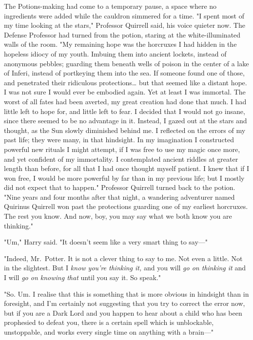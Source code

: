 The Potions-making had come to a temporary pause, a space where no ingredients 
were added while the cauldron simmered for a time. "I spent most of my time 
looking at the stars," Professor Quirrell said, his voice quieter now. The 
Defense Professor had turned from the potion, staring at the white-illuminated 
walls of the room. "My remaining hope was the horcruxes I had hidden in the 
hopeless idiocy of my youth. Imbuing them into ancient lockets, instead of 
anonymous pebbles; guarding them beneath wells of poison in the center of a 
lake of Inferi, instead of portkeying them into the sea. If someone found one 
of those, and penetrated their ridiculous protections{\ldots} but that seemed 
like a distant hope. I was not sure I would ever be embodied again. Yet at 
least I was immortal. The worst of all fates had been averted, my great 
creation had done that much. I had little left to hope for, and little left to 
fear. I decided that I would not go insane, since there seemed to be no 
advantage in it. Instead, I gazed out at the stars and thought, as the Sun 
slowly diminished behind me. I reflected on the errors of my past life; they 
were many, in that hindsight. In my imagination I constructed powerful new 
rituals I might attempt, if I was free to use my magic once more, and yet 
confident of my immortality. I contemplated ancient riddles at greater length 
than before, for all that I had once thought myself patient. I knew that if I 
won free, I would be more powerful by far than in my previous life; but I 
mostly did not expect that to happen." Professor Quirrell turned back to the 
potion. "Nine years and four months after that night, a wandering adventurer 
named Quirinus Quirrell won past the protections guarding one of my earliest 
horcruxes. The rest you know. And now, boy, you may say what we both know you 
are thinking."

"Um," Harry said. "It doesn't seem like a very smart thing to say---"

"Indeed, Mr.~Potter. It is not a clever thing to say to me. Not even a little. 
Not in the slightest. But I \emph{know you're thinking it,} and you will 
\emph{go on thinking it} and I will \emph{go on knowing that} until you say it. 
So speak."

"So. Um. I realise that this is something that is more obvious in hindsight 
than in foresight, and I'm certainly not suggesting that you try to correct the 
error now, but if you are a Dark Lord and you happen to hear about a child who 
has been prophesied to defeat you, there is a certain spell which is 
unblockable, unstoppable, and works every single time on anything with a 
brain---"

